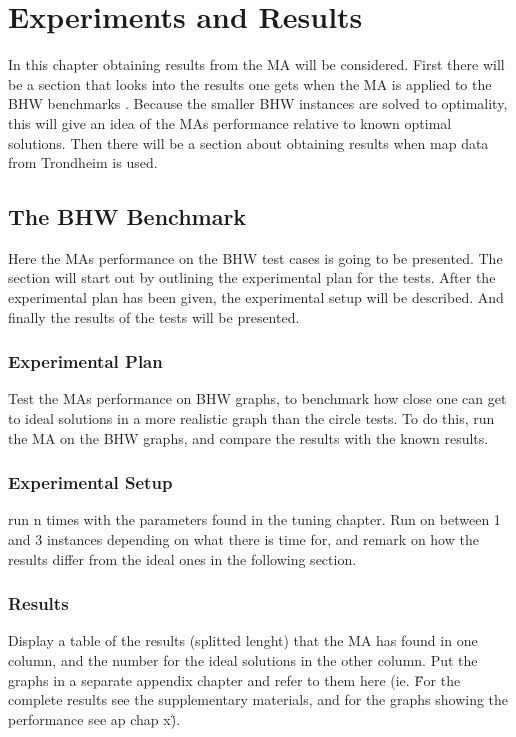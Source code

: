 \chapter{Experiments and Results}
\label{cha:experiments_and_results}

In this chapter obtaining results from the MA will be considered. First there will be a section that looks into the results one gets when the MA is applied to the BHW  benchmarks \citep{BHWdocumentationSINTEF}. Because the smaller BHW instances are solved to optimality, this will give an idea of the MAs performance relative to known optimal solutions. Then there will be a section about obtaining results when map data from Trondheim is used.

\section{The BHW Benchmark}

Here the MAs performance on the BHW test cases is going to be presented. The section will start out by outlining the experimental plan for the tests. After the experimental plan has been given, the experimental setup will be described. And finally the results of the tests will be presented.

\subsection{Experimental Plan}
Test the MAs performance on BHW graphs, to benchmark how close one can get to ideal solutions in a more realistic graph than the circle tests. To do this, run the MA on the BHW graphs, and compare the results with the known results.

\subsection{Experimental Setup}
run n times with the parameters found in the tuning chapter. Run on between 1 and 3 instances depending on what there is time for, and remark on how the results differ from the ideal ones in the following section.

\subsection{Results}
Display a table of the results (splitted lenght) that the MA has found in one column, and the number for the ideal solutions in the other column. Put the graphs in a separate appendix chapter and refer to them here (ie. \"For the complete results see the supplementary materials, and for the graphs showing the performance see ap chap x\").

